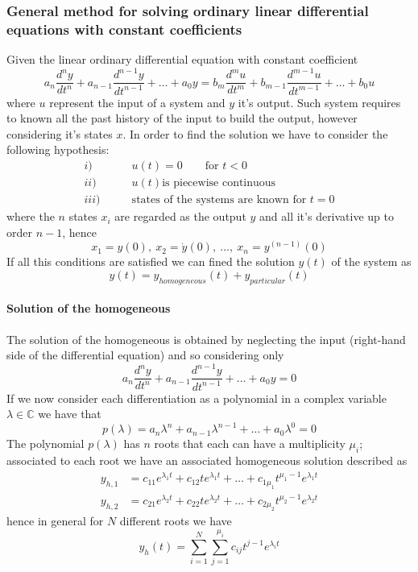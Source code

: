 	\subsubsection{General method for solving ordinary linear differential equations with constant coefficients}
		
		Given the linear ordinary differential equation with constant coefficient
		\begin{equation}
			a_n \frac{d^ny}{dt^n} + a_{n-1} \frac{d^{n-1}y}{dt^{n-1}} + \dots + a_0 y = b_m \frac{d^mu}{dt^m} + b_{m-1} \frac{d^{m-1}u}{dt^{m-1}} + \dots + b_0 u
		\end{equation}
		where $u$ represent the input of a system and $y$ it's output. Such system requires to known all the past history of the input to build the output, however considering it's states $x$. In order to find the solution we have to consider the following hypothesis:
		\begin{align*}
			i)& \qquad u(t) = 0 \qquad \textrm{for } t < 0 \\
			ii)& \qquad u(t) \textrm{is piecewise continuous} \\
			iii) & \qquad \textrm{states of the systems are known for } t = 0
		\end{align*}
		where the $n$ states $x_i$ are regarded as the output $y$ and all it's derivative up to order $n-1$, hence
		\[ x_1 = y(0) , \ x_2 = \dot y(0), \ \dots, \ x_n = y^{(n-1)}(0) \]
		If all this conditions are satisfied we can fined the solution $y(t)$ of the system as
		\begin{equation}
			y(t) = y_{homogeneous}(t) + y_{particular}(t)
		\end{equation}
	
		\paragraph{Solution of the homogeneous} The solution of the homogeneous is obtained by neglecting the input (right-hand side of the differential equation) and so considering only
		\[ a_n \frac{d^ny}{dt^n} + a_{n-1} \frac{d^{n-1}y}{dt^{n-1}} + \dots + a_0 y = 0 \]
		If we now consider each differentiation as a polynomial in a complex variable $\lambda \in \mathds C$ we have that
		\[ p(\lambda) = a_n \lambda^n + a_{n-1} \lambda^{n-1} + \dots + a_0 \lambda^0 = 0 \]
		The polynomial $p(\lambda)$ has $n$ roots that each can have a multiplicity $\mu_i$; associated to each root we have an associated homogeneous solution described as
		\begin{align*}
			y_{h,1} &= c_{11} e^{\lambda_1 t} + c_{12} t e^{\lambda_1 t} + \dots + c_{1\mu_1} t^{\mu_1-1} e^{\lambda_1 t} \\
			y_{h,2} &= c_{21} e^{\lambda_2 t} + c_{22} t e^{\lambda_2 t} + \dots + c_{2\mu_2} t^{\mu_2-1} e^{\lambda_2 t}
		\end{align*}
		hence in general for $N$ different roots we have
		\begin{equation}
			y_h(t) = \sum_{i=1}^{N} \sum_{j=1}^{\mu_i} c_{ij} t^{j-1} e^{\lambda_i t}
		\end{equation}
		
